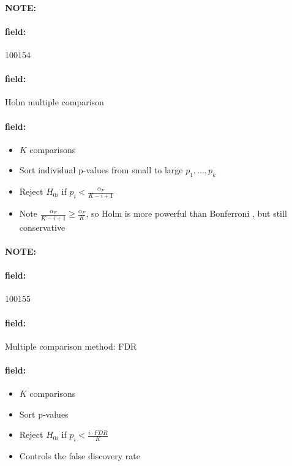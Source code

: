 \documentclass[12pt]{article}
\newenvironment{note}{\paragraph{NOTE:}}{}
\newenvironment{field}{\paragraph{field:}}{}
\begin{document}
\begin{note}
    \begin{field}
        \tiny 100154
    \end{field}
    \begin{field}
        Holm multiple comparison
    \end{field}
    \begin{field}
        \begin{itemize}
          \item $K$ comparisons
          \item Sort individual p-values from small to large $p_1, \ldots, p_k$
          \item Reject $H_{0i}$ if $p_i < \frac{\alpha_F}{K-i+1}$
          \item Note $\frac{\alpha_F}{K-i+1} \geq \frac{\alpha_F}{K}$, so Holm is more powerful than Bonferroni , but still conservative
        \end{itemize}
    \end{field}
\end{note}

\begin{note}
    \begin{field}
        \tiny 100155
    \end{field}
    \begin{field}
        Multiple comparison method: FDR
    \end{field}
    \begin{field}
        \begin{itemize}
          \item $K$ comparisons
          \item Sort p-values
          \item Reject $H_{0i}$ if $p_i < \frac{i \cdot FDR}{K}$
          \item Controls the false discovery rate
        \end{itemize}
    \end{field}
\end{note}
\end{document}
